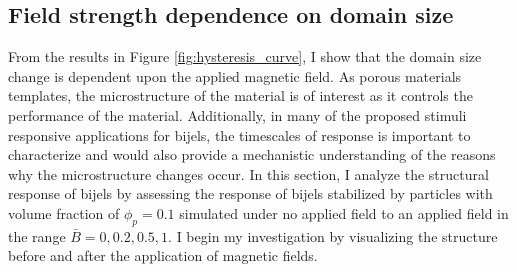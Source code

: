 \subsection{Field strength dependence on domain size}
\label{section:field-strength-dependence-on-domain-size}

From the results in Figure \ref{fig:hysteresis_curve}, I show that the domain size change is dependent upon the applied magnetic field. As porous materials templates,
the microstructure of the material is of interest as it controls the performance of the material. Additionally, in many of the proposed stimuli responsive applications
for bijels, the timescales of response is important to characterize and would also provide a mechanistic understanding of the reasons why the microstructure changes 
occur. In this section, I analyze the structural response of bijels by assessing the response of bijels stabilized by particles with volume fraction of 
$\phi_p = 0.1$ simulated under no applied field to an applied field in the range $\bar{B} = 0, 0.2, 0.5, 1$. I begin my investigation by visualizing the structure before 
and after the application of magnetic fields.

